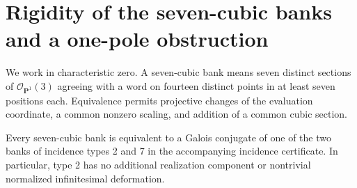 \section{Rigidity of the seven-cubic banks and a one-pole obstruction}
\label{app:seven-bank-augmentation}

We work in characteristic zero.  A seven-cubic bank means seven distinct
sections of $\mathcal O_{\mathbf P^1}(3)$ agreeing with a word on fourteen
distinct points in at least seven positions each.  Equivalence permits
projective changes of the evaluation coordinate, a common nonzero scaling,
and addition of a common cubic section.

\begin{proposition}\label{prop:seven-bank-rigidity}
Every seven-cubic bank is equivalent to a Galois conjugate of one of the
two banks of incidence types 2 and 7 in the accompanying incidence
certificate.  In particular, type 2 has no additional realization
component or nontrivial normalized infinitesimal deformation.
\end{proposition}
